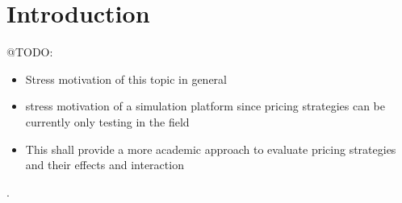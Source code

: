 \section{Introduction}

@TODO:

\begin{itemize}
\item Stress motivation of this topic in general
\item stress motivation of a simulation platform since pricing strategies can be currently only testing in the field
\item This shall provide a more academic approach to evaluate pricing strategies and their effects and interaction
\end{itemize}

\citep{uflacker2016ertragsmanagement} \citep{schlosser2016optimal} \citep{schlosser2016stochastic} \citep{schlosser2016survive}.